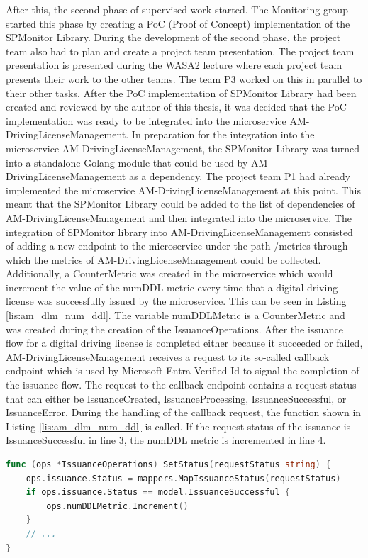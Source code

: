 After this, the second phase of supervised work started. 
The Monitoring group started this phase by creating a PoC (Proof of Concept)
implementation of the SPMonitor Library. During the development of the second phase, the project team also
had to plan and create a project team presentation. The project team presentation is presented during the WASA2 lecture
where each project team presents their work to the other teams. The team P3 worked on this in parallel to their other tasks.
After the PoC implementation of SPMonitor Library had been created and reviewed by the author of this thesis, it was decided
that the PoC implementation was ready to be integrated into the microservice AM-DrivingLicenseManagement.
In preparation for the integration into the microservice AM-DrivingLicenseManagement, the SPMonitor Library was turned into
a standalone Golang module that could be used by AM-DrivingLicenseManagement as a dependency.
The project team P1 had already implemented the microservice AM-DrivingLicenseManagement at this point.
This meant that the SPMonitor Library could be added to the list of dependencies of AM-DrivingLicenseManagement
and then integrated into the microservice. The integration of SPMonitor library into AM-DrivingLicenseManagement
consisted of adding a new endpoint to the microservice under the path /metrics through which the metrics of AM-DrivingLicenseManagement
could be collected. Additionally, a CounterMetric was created in the microservice which would increment the value of the numDDL metric
every time that a digital driving license was successfully issued by the microservice. This can be seen in Listing \ref{lis:am_dlm_num_ddl}.
The variable numDDLMetric is a CounterMetric and was created during the creation of the IssuanceOperations.
After the issuance flow for a digital driving license is completed either because it succeeded or failed,
AM-DrivingLicenseManagement receives a request to its so-called callback endpoint which is used by Microsoft Entra Verified Id \cite{MIC-ENT}
to signal the completion of the issuance flow. The request to the callback endpoint contains a request status
that can either be IssuanceCreated, IssuanceProcessing, IssuanceSuccessful, or IssuanceError.
During the handling of the callback request, the function shown in Listing \ref{lis:am_dlm_num_ddl} is called.
If the request status of the issuance is IssuanceSuccessful in line 3, the numDDL metric is incremented in line 4.

\begin{lstlisting}[caption = {Usage of the SPMonitor Library in AM-DrivingLicenseManagement}, label = {lis:am_dlm_num_ddl}, style = kit-cm, language=Go]
func (ops *IssuanceOperations) SetStatus(requestStatus string) {
	ops.issuance.Status = mappers.MapIssuanceStatus(requestStatus)
	if ops.issuance.Status == model.IssuanceSuccessful {
		ops.numDDLMetric.Increment()
	}
	// ...
}
\end{lstlisting}

